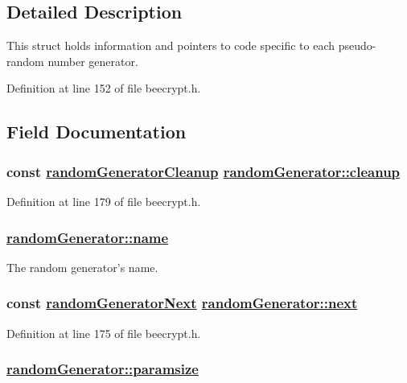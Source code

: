 \subsection{Detailed Description}
This struct holds information and pointers to code specific to each pseudo-random number generator. 

Definition at line 152 of file beecrypt.h.

\subsection{Field Documentation}
\hypertarget{structrandomGenerator_o5}{
\subsubsection[cleanup]{\setlength{\rightskip}{0pt plus 5cm}const \hyperlink{beecrypt_8h_a5}{random\-Generator\-Cleanup} \hyperlink{structrandomGenerator_o5}{random\-Generator::cleanup}}}
\label{structrandomGenerator_o5}


Definition at line 179 of file beecrypt.h.\hypertarget{structrandomGenerator_o0}{
\subsubsection[name]{\setlength{\rightskip}{0pt plus 5cm}\hyperlink{structrandomGenerator_o0}{random\-Generator::name}}}
\label{structrandomGenerator_o0}


The random generator's name. 

\hypertarget{structrandomGenerator_o4}{
\subsubsection[next]{\setlength{\rightskip}{0pt plus 5cm}const \hyperlink{beecrypt_8h_a4}{random\-Generator\-Next} \hyperlink{structrandomGenerator_o4}{random\-Generator::next}}}
\label{structrandomGenerator_o4}


Definition at line 175 of file beecrypt.h.\hypertarget{structrandomGenerator_o1}{
\subsubsection[paramsize]{\setlength{\rightskip}{0pt plus 5cm}\hyperlink{structrandomGenerator_o1}{random\-Generator::paramsize}}}
\label{structrandomGenerator_o1}



